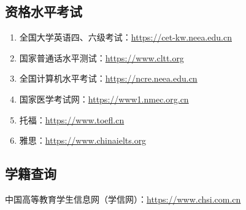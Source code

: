 \subsection[资格水平考试]{资格水平考试}
\begin{enumerate}
    \item 全国大学英语四、六级考试：\href{https://cet-kw.neea.edu.cn}{https://cet-kw.neea.edu.cn}
    \item 国家普通话水平测试：\href{https://www.cltt.org}{https://www.cltt.org}
    \item 全国计算机水平考试：\href{https://ncre.neea.edu.cn}{https://ncre.neea.edu.cn}
    \item 国家医学考试网：\href{https://www1.nmec.org.cn}{https://www1.nmec.org.cn}
    \item 托福：\href{https://www.toefl.cn}{https://www.toefl.cn}
    \item 雅思：\href{https://www.chinaielts.org}{https://www.chinaielts.org}
\end{enumerate}

\subsection[学籍查询]{学籍查询}
\label{student_status_query}
中国高等教育学生信息网（学信网）：\href{https://www.chsi.com.cn}{https://www.chsi.com.cn}

\newpage

